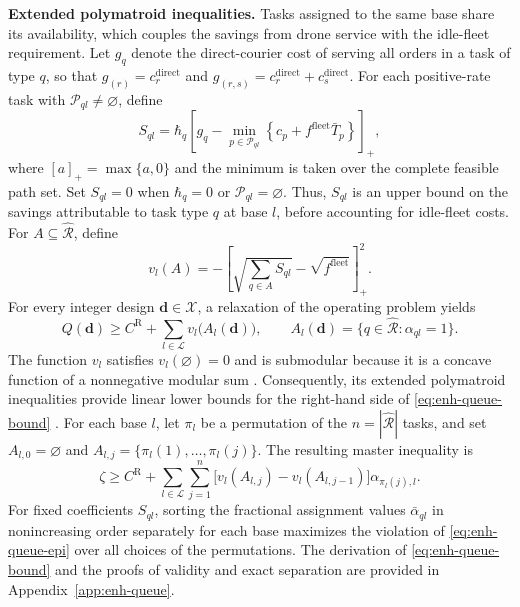\documentclass[11pt]{article}
\begin{document}
\noindent\textbf{Extended polymatroid inequalities.}
Tasks assigned to the same base share its availability, which couples the savings from drone service with the idle-fleet requirement.
Let $g_q$ denote the direct-courier cost of serving all orders in a task of type $q$, so that $g_{(r)}=c_r^{\mathrm{direct}}$ and $g_{(r,s)}=c_r^{\mathrm{direct}}+c_s^{\mathrm{direct}}$.
For each positive-rate task with $\mathcal P_{ql}\ne\varnothing$, define
\begin{equation}
    S_{ql}
    =\hbar_q\left[g_q-
    \min_{p\in\mathcal P_{ql}}
    \left\{c_p+f^{\mathrm{fleet}}\bar T_p\right\}\right]_+,
    \label{eq:enh-task-savings}
\end{equation}
where $[a]_+=\max\{a,0\}$ and the minimum is taken over the complete feasible path set.
Set $S_{ql}=0$ when $\hbar_q=0$ or $\mathcal P_{ql}=\varnothing$.
Thus, $S_{ql}$ is an upper bound on the savings attributable to task type $q$ at base $l$, before accounting for idle-fleet costs.
For $A\subseteq\hat{\mathcal R}$, define
\begin{equation}
    v_l(A)
    =-\left[\sqrt{\sum_{q\in A}S_{ql}}
    -\sqrt{f^{\mathrm{fleet}}}\right]_+^2.
    \label{eq:enh-queue-function}
\end{equation}
For every integer design $\boldsymbol d\in\mathcal X$, a relaxation of the operating problem yields
\begin{equation}
    Q(\boldsymbol d)
    \ge C^{\mathrm R}
    +\sum_{l\in\mathcal L}v_l\bigl(A_l(\boldsymbol d)\bigr),
    \qquad
    A_l(\boldsymbol d)=\{q\in\hat{\mathcal R}:\alpha_{ql}=1\}.
    \label{eq:enh-queue-bound}
\end{equation}
The function $v_l$ satisfies $v_l(\varnothing)=0$ and is submodular because it is a concave function of a nonnegative modular sum \citep{YuKucukyavuz2023Concave}.
Consequently, its extended polymatroid inequalities provide linear lower bounds for the right-hand side of \eqref{eq:enh-queue-bound} \citep{AtamturkNarayanan2022Polarity}.
For each base $l$, let $\pi_l$ be a permutation of the $n=|\hat{\mathcal R}|$ tasks, and set $A_{l,0}=\varnothing$ and $A_{l,j}=\{\pi_l(1),\ldots,\pi_l(j)\}$.
The resulting master inequality is
\begin{equation}
    \zeta\ge C^{\mathrm R}
    +\sum_{l\in\mathcal L}\sum_{j=1}^{n}
    \bigl[v_l(A_{l,j})-v_l(A_{l,j-1})\bigr]
    \alpha_{\pi_l(j),l}.
    \label{eq:enh-queue-epi}
\end{equation}
For fixed coefficients $S_{ql}$, sorting the fractional assignment values $\bar\alpha_{ql}$ in nonincreasing order separately for each base maximizes the violation of \eqref{eq:enh-queue-epi} over all choices of the permutations.
The derivation of \eqref{eq:enh-queue-bound} and the proofs of validity and exact separation are provided in Appendix~\ref{app:enh-queue}.
\end{document}
